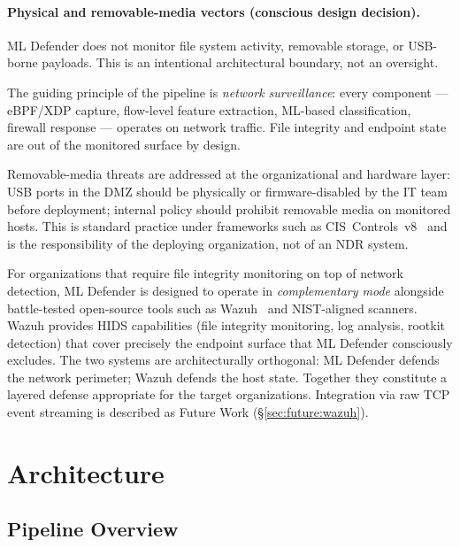 \documentclass[11pt,a4paper]{article}
\begin{document}
    \paragraph{Physical and removable-media vectors (conscious design decision).}
    ML Defender does not monitor file system activity, removable storage, or
    USB-borne payloads. This is an intentional architectural boundary, not an
    oversight.

    The guiding principle of the pipeline is \emph{network surveillance}: every
    component --- eBPF/XDP capture, flow-level feature extraction, ML-based
    classification, firewall response --- operates on network traffic. File
    integrity and endpoint state are out of the monitored surface by design.

    Removable-media threats are addressed at the organizational and hardware
    layer: USB ports in the DMZ should be physically or firmware-disabled by the
    IT team before deployment; internal policy should prohibit removable media on
    monitored hosts. This is standard practice under frameworks such as
    CIS~Controls~v8~\cite{ciscontrols2021} and is the responsibility of the
    deploying organization, not of an NDR system.

    For organizations that require file integrity monitoring on top of network
    detection, ML Defender is designed to operate in \emph{complementary mode}
    alongside battle-tested open-source tools such as Wazuh~\cite{wazuh2024} and
    NIST-aligned scanners. Wazuh provides HIDS capabilities (file integrity
    monitoring, log analysis, rootkit detection) that cover precisely the
    endpoint surface that ML Defender consciously excludes. The two systems are
    architecturally orthogonal: ML Defender defends the network perimeter; Wazuh
    defends the host state. Together they constitute a layered defense appropriate
    for the target organizations. Integration via raw TCP event streaming is
    described as Future Work (\S\ref{sec:future:wazuh}).

    \section{Architecture}

    \subsection{Pipeline Overview}
\end{document}
